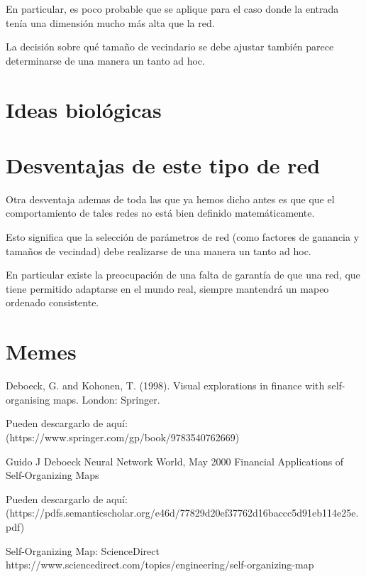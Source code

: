 \documentclass[fleqn, journal, onecolumn]{IEEEtran}             %
\theoremstyle{break}                                            %
\begin{document}
    En particular, es poco probable que se aplique para el caso donde la entrada tenía una 
    dimensión mucho más alta que la red. 

    La decisión sobre qué tamaño de vecindario se debe ajustar también parece determinarse de 
    una manera un tanto ad hoc.

  \section{Ideas biológicas}


  \section{Desventajas de este tipo de red}

    Otra desventaja ademas de toda las que ya hemos dicho antes es que que el comportamiento 
    de tales redes no está bien definido matemáticamente.
    
    Esto significa que la selección de parámetros de red (como factores de ganancia y tamaños de 
    vecindad) debe realizarse de una manera un tanto ad hoc. 
    
    En particular existe la preocupación de una falta de garantía de que una red, 
    que tiene permitido adaptarse en el mundo real, siempre mantendrá un mapeo ordenado consistente.

  \section{Memes}

    

    \begin{thebibliography}{10}

        Deboeck, G. and Kohonen, T. (1998). 
        Visual explorations in finance with self-organising maps. London: Springer.

        Pueden descargarlo de aquí: (https://www.springer.com/gp/book/9783540762669)



          Guido J Deboeck
          Neural Network World, May 2000
          Financial Applications of Self-Organizing Maps

          Pueden descargarlo de aquí:  (https://pdfs.semanticscholar.org/e46d/77829d20ef37762d16baccc5d91eb114e25e.pdf)

            
        Self-Organizing Map: ScienceDirect
        https://www.sciencedirect.com/topics/engineering/self-organizing-map



    \end{thebibliography}
\end{document}
